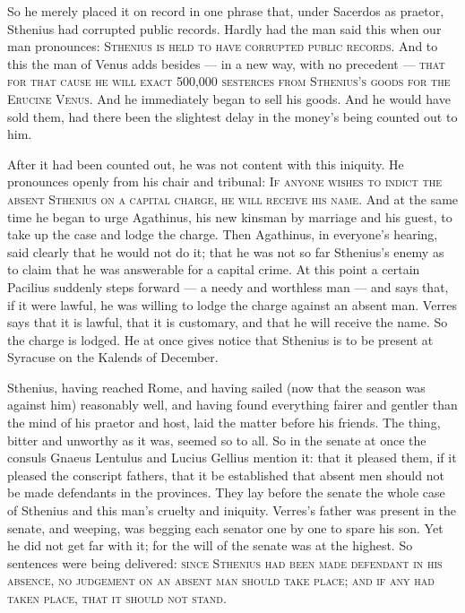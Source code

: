  So he merely placed it on record in one phrase that, under Sacerdos as praetor, Sthenius had corrupted public records. Hardly had the man said this when our man pronounces: \textsc{Sthenius is held to have corrupted public records}. And to this the man of Venus adds besides --- in a new way, with no precedent --- \textsc{that for that cause he will exact 500{,}000 sesterces from Sthenius's goods for the Erucine Venus}. And he immediately began to sell his goods. And he would have sold them, had there been the slightest delay in the money's being counted out to him.

 After it had been counted out, he was not content with this iniquity. He pronounces openly from his chair and tribunal: \textsc{If anyone wishes to indict the absent Sthenius on a capital charge, he will receive his name}. And at the same time he began to urge Agathinus, his new kinsman by marriage and his guest, to take up the case and lodge the charge. Then Agathinus, in everyone's hearing, said clearly that he would not do it; that he was not so far Sthenius's enemy as to claim that he was answerable for a capital crime. At this point a certain Pacilius suddenly steps forward --- a needy and worthless man --- and says that, if it were lawful, he was willing to lodge the charge against an absent man. Verres says that it is lawful, that it is customary, and that he will receive the name. So the charge is lodged. He at once gives notice that Sthenius is to be present at Syracuse on the Kalends of December.

 Sthenius, having reached Rome, and having sailed (now that the season was against him) reasonably well, and having found everything fairer and gentler than the mind of his praetor and host, laid the matter before his friends. The thing, bitter and unworthy as it was, seemed so to all. So in the senate at once the consuls Gnaeus Lentulus and Lucius Gellius mention it: that it pleased them, if it pleased the conscript fathers, that it be established that absent men should not be made defendants in the provinces. They lay before the senate the whole case of Sthenius and this man's cruelty and iniquity. Verres's father was present in the senate, and weeping, was begging each senator one by one to spare his son. Yet he did not get far with it; for the will of the senate was at the highest. So sentences were being delivered: \textsc{since Sthenius had been made defendant in his absence, no judgement on an absent man should take place; and if any had taken place, that it should not stand}.

